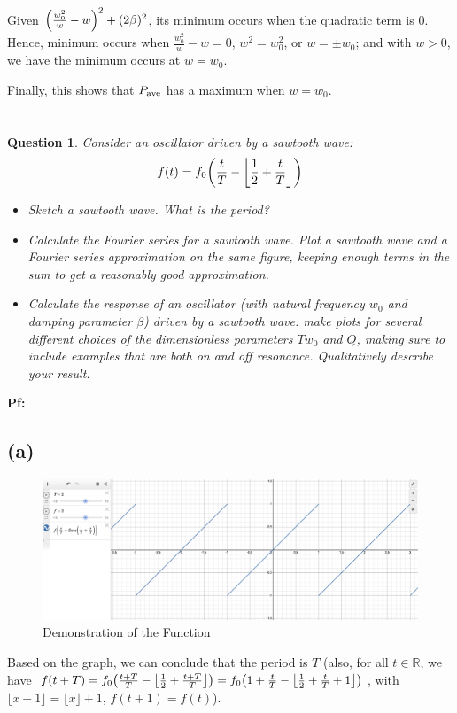 \documentclass{article}
\newtheorem{question}{Question}
\newcommand{\RR}{\mathbb{R}}
\DeclarePairedDelimiter{\paran}{(}{)}%
\begin{document}
Given $\paran*{\frac{w_0^2}{w}-w}^2+(2\beta)^2$, its minimum occurs when the quadratic term is $0$. Hence, minimum occurs when $\frac{w_0^2}{w}-w=0$, $w^2=w_0^2$, or $w=\pm w_0$; and with $w>0$, we have the minimum occurs at $w=w_0$.

Finally, this shows that $P_\textmd{ave}$ has a maximum when $w=w_0$.

\break


\section{}
\begin{question}\label{q4}
    Consider an oscillator driven by a sawtooth wave:
    $$f(t)=f_0\paran*{\frac{t}{T}-\left\lfloor\frac{1}{2}+\frac{t}{T}\right\rfloor}$$
    \begin{itemize}
        \item[(a)] Sketch a sawtooth wave. What is the period?
        \item[(b)] Calculate the Fourier series for a sawtooth wave. Plot a sawtooth wave and a Fourier series approximation on the same figure, keeping enough terms in the sum to get a reasonably good approximation.
        \item[(c)] Calculate the response of an oscillator (with natural frequency $w_0$ and damping parameter $\beta$) driven by a sawtooth wave. make plots for several different choices of the dimensionless parameters $Tw_0$ and $Q$, making sure to include examples that are both on and off resonance. Qualitatively describe your result.
    \end{itemize}
\end{question}

\textbf{Pf:}
\subsection*{(a)}
\begin{figure}[h!]
    \begin{center}
        \includegraphics[width = 150mm]{sketch plot q3_a.png}
        \caption{Demonstration of the Function}
    \end{center}
\end{figure}
Based on the graph, we can conclude that the period is $T$ (also, for all $t \in \RR$, we have $f(t+T) = f_0\paran*{\frac{t+T}{T}-\left\lfloor\frac{1}{2}+\frac{t+T}{T}\right\rfloor}=f_0\paran*{1+\frac{t}{T}-\left\lfloor\frac{1}{2}+\frac{t}{T}+1\right\rfloor}$, with $\lfloor x+1\rfloor = \lfloor x\rfloor +1$, $f(t+1)=f(t)$).
\end{document}
